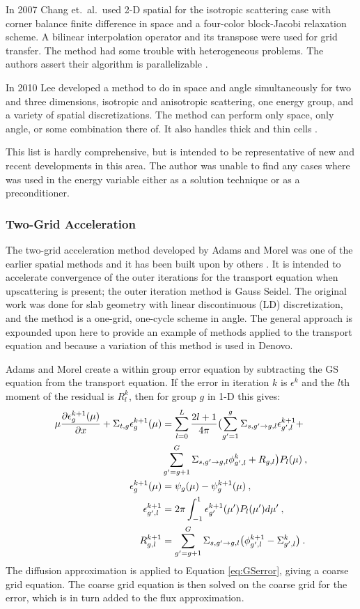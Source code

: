 In 2007 Chang et.\ al.\ used 2-D spatial \mg for the isotropic scattering case with corner balance finite difference in space and a four-color block-Jacobi relaxation scheme. A bilinear interpolation operator and its transpose were used for grid transfer. The method had some trouble with heterogeneous problems. The authors assert their algorithm is parallelizable \cite{Chang2007}.

In 2010 Lee developed a method to do \mg in space and angle simultaneously for two and three dimensions, isotropic and anisotropic scattering, one energy group, and a variety of spatial discretizations. The method can perform \mg only space, only angle, or some combination there of. It also handles thick and thin cells \cite{Lee2010}.

This list is hardly comprehensive, but is intended to be representative of new and recent developments in this area. The author was unable to find any cases where \mg was used in the energy variable either as a solution technique or as a preconditioner. 

\subsubsection{Two-Grid Acceleration}
The two-grid acceleration method developed by Adams and Morel was one of the earlier spatial \mg methods and it has been built upon by others \cite{Adams1993}. It is intended to accelerate convergence of the outer iterations for the transport equation when upscattering is present; the outer iteration method is Gauss Seidel. The original work was done for slab geometry with linear discontinuous (LD) discretization, and the method is a one-grid, one-cycle scheme in angle. The general approach is expounded upon here to provide an example of \mg methods applied to the transport equation and because a variation of this method is used in Denovo. 

Adams and Morel create a within group error equation by subtracting the GS equation from the transport equation. If the error in iteration $k$ is $\epsilon^k$ and the $l$th moment of the residual is $R_l^k$, then for group $g$ in 1-D this gives:
%
\begin{align}
   \mu \frac{\partial \epsilon_{g}^{k+1}(\mu)}{\partial x} + \Sigma_{t,g} \epsilon_{g}^{k+1}(\mu) &= \sum_{l=0}^{L}\frac{2l+1}{4\pi} \bigl( \sum_{g'=1}^{g}\Sigma_{s,g' \to g, l} \epsilon_{g',l}^{k+1} 
   +  \label{eq:GSerror} \\
   &\sum_{g'=g+1}^{G}\Sigma_{s,g' \to g, l} \phi_{g',l}^{k} + R_{g,l}\bigr) P_{l}(\mu) \:, \nonumber \\
  \epsilon_{g}^{k+1}(\mu) &= \psi_{g}(\mu) - \psi_{g}^{k+1}(\mu) \:, \\
  \epsilon_{g',l}^{k+1} &= 2\pi \int_{-1}^{1}\epsilon_{g'}^{k+1}(\mu') P_{l}(\mu') d\mu' \:, \\ 
  R_{g,l}^{k+1} &=  \sum_{g'=g+1}^{G}\Sigma_{s,g' \to g, l} \bigl( \phi_{g',l}^{k+1} - \Sigma_{g',l}^{k} \bigr) \:.
\end{align}
%
The diffusion approximation is applied to Equation \eqref{eq:GSerror}, giving a coarse grid equation. The coarse grid equation is then solved on the coarse grid for the error, which is in turn added to the flux approximation. 

